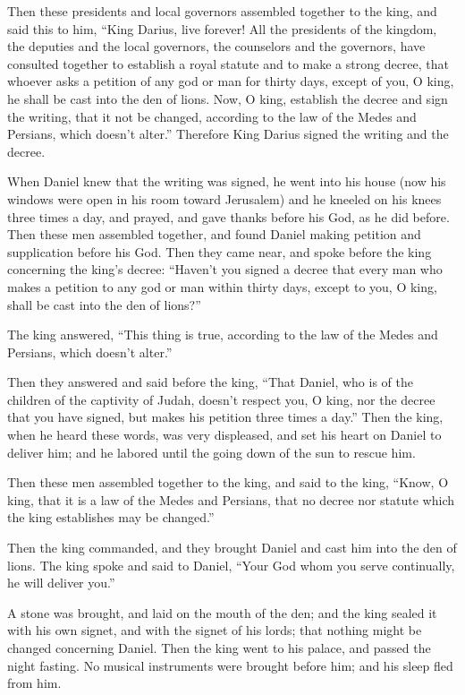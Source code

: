  Then these presidents and local governors assembled
together to the king, and said this to him, ``King Darius, live forever!
 All the presidents of the kingdom, the deputies and the
local governors, the counselors and the governors, have consulted
together to establish a royal statute and to make a strong decree, that
whoever asks a petition of any god or man for thirty days, except of
you, O king, he shall be cast into the den of lions.  Now,
O king, establish the decree and sign the writing, that it not be
changed, according to the law of the Medes and Persians, which doesn't
alter.''  Therefore King Darius signed the writing and the
decree.

 When Daniel knew that the writing was signed, he went
into his house (now his windows were open in his room toward Jerusalem)
and he kneeled on his knees three times a day, and prayed, and gave
thanks before his God, as he did before.  Then these men
assembled together, and found Daniel making petition and supplication
before his God.  Then they came near, and spoke before
the king concerning the king's decree: ``Haven't you signed a decree
that every man who makes a petition to any god or man within thirty
days, except to you, O king, shall be cast into the den of lions?''

The king answered, ``This thing is true, according to the law of the
Medes and Persians, which doesn't alter.''

 Then they answered and said before the king, ``That
Daniel, who is of the children of the captivity of Judah, doesn't
respect you, O king, nor the decree that you have signed, but makes his
petition three times a day.''  Then the king, when he
heard these words, was very displeased, and set his heart on Daniel to
deliver him; and he labored until the going down of the sun to rescue
him.

 Then these men assembled together to the king, and said
to the king, ``Know, O king, that it is a law of the Medes and Persians,
that no decree nor statute which the king establishes may be changed.''

 Then the king commanded, and they brought Daniel and
cast him into the den of lions. The king spoke and said to Daniel,
``Your God whom you serve continually, he will deliver you.''

 A stone was brought, and laid on the mouth of the den;
and the king sealed it with his own signet, and with the signet of his
lords; that nothing might be changed concerning Daniel. 
Then the king went to his palace, and passed the night fasting. No
musical instruments were brought before him; and his sleep fled from
him.

